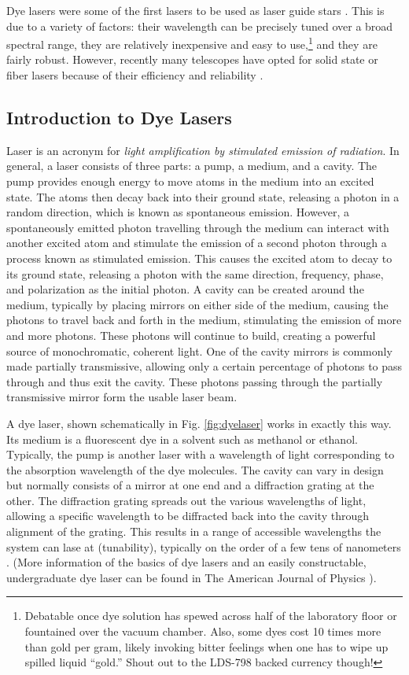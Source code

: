 Dye lasers were some of the first lasers to be used as laser guide stars \cite{Primmerman1991}. This is due to a variety of factors: their wavelength can be precisely tuned over a broad spectral range, they are relatively inexpensive and easy to use,\footnote{Debatable once dye solution has spewed across half of the laboratory floor or fountained over the vacuum chamber. Also, some dyes cost 10 times more than gold per gram, likely invoking bitter feelings when one has to wipe up spilled liquid ``gold.'' Shout out to the LDS-798 backed currency though!} and they are fairly robust. However, recently many telescopes have opted for solid state or fiber lasers because of their efficiency and reliability \cite{Wizinowich2006}.

\subsection{Introduction to Dye Lasers}
Laser is an acronym for \textit{light amplification by stimulated emission of radiation}. In general, a laser consists of three parts: a pump, a medium, and a cavity. The pump provides enough energy to move atoms in the medium into an excited state. The atoms then decay back into their ground state, releasing a photon in a random direction, which is known as spontaneous emission. However, a spontaneously emitted photon travelling through the medium can interact with another excited atom and stimulate the emission of a second photon through a process known as stimulated emission. This causes the excited atom to decay to its ground state, releasing a photon with the same direction, frequency, phase, and polarization as the initial photon. A cavity can be created around the medium, typically by placing mirrors on either side of the medium, causing the photons to travel back and forth in the medium, stimulating the emission of more and more photons. These photons will continue to build, creating a powerful source of monochromatic, coherent light. One of the cavity mirrors is commonly made partially transmissive, allowing only a certain percentage of photons to pass through and thus exit the cavity. These photons passing through the partially transmissive mirror form the usable laser beam. 

A dye laser, shown schematically in Fig. \ref{fig:dyelaser} works in exactly this way. Its medium is a fluorescent dye in a solvent such as methanol or ethanol. Typically, the pump is another laser with a wavelength of light corresponding to the absorption wavelength of the dye molecules. The cavity can vary in design but normally consists of a mirror at one end and a diffraction grating at the other. The diffraction grating spreads out the various wavelengths of light, allowing a specific wavelength to be diffracted back into the cavity through alignment of the grating. This results in a range of accessible wavelengths the system can lase at (tunability), typically on the order of a few tens of nanometers \cite{Sohl1997}. (More information of the basics of dye lasers and an easily constructable, undergraduate dye laser can be found in The American Journal of Physics \cite{Sohl1997}).

